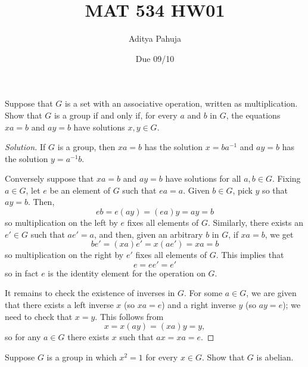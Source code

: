 \documentclass[11pt]{scrartcl}
\title{\vspace{-2em}MAT 534 HW01}
\author{\large Aditya Pahuja}
\date{\large Due 09/10}
\providecommand{\inv}{^{-1}}
\newenvironment{soln}{\begin{proof}[Solution]}{\end{proof}}
\begin{document}
\maketitle

\begin{problem}
    Suppose that $G$ is a set with an associative operation,
    written as multiplication. Show that $G$ is a group if and only if,
    for every $a$ and $b$ in $G$, the equations
    $xa = b$ and $ay = b$ have solutions $x,y\in G$.
\end{problem}

\begin{soln}
    If $G$ is a group, then $xa = b$ has the solution $x = ba\inv$
    and $ay = b$ has the solution $y = a\inv b$.

    Conversely suppose that $xa = b$ and $ay = b$
    have solutions for all $a,b\in G$.
    Fixing $a\in G$, let $e$ be an element of $G$ such that $ea = a$.
    Given $b\in G$, pick $y$ so that $ay = b$. Then,
    \begin{equation*}
	eb = e(ay) = (ea)y = ay = b
    \end{equation*}
    so multiplication on the left by $e$ fixes all elements of $G$.
    Similarly, there exists an $e'\in G$ such that $ae' = a$,
    and then, given an arbitrary $b$ in $G$, if $xa = b$, we get
    \begin{equation*}
        be' = (xa)e' = x(ae') = xa = b
    \end{equation*}
    so multiplication on the right by $e'$ fixes all elements of $G$.
    This implies that
    \begin{equation*}
        e = ee' = e'
    \end{equation*}
    so in fact $e$ is the identity element for the operation on $G$.

    It remains to check the existence of inverses in $G$.
    For some $a\in G$, we are given that there exists a left inverse
    $x$ (so $xa = e$) and a right inverse $y$ (so $ay = e$);
    we need to check that $x = y$. This follows from
    \begin{equation*}
        x = x(ay) = (xa)y = y,
    \end{equation*}
    so for any $a\in G$ there exists $x$ such that $ax = xa = e$.
\end{soln}

\begin{problem}
    Suppose $G$ is a group in which $x^2 = 1$ for every $x\in G$.
    Show that $G$ is abelian.
\end{problem}
\end{document}
